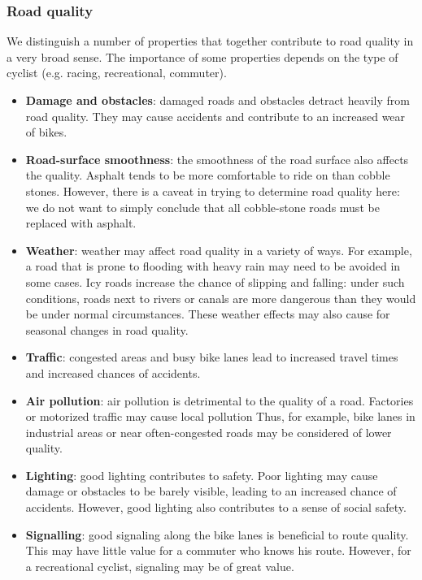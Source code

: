 \documentclass[a4paper,11pt]{article}
\begin{document}
\subsubsection{Road quality}

We distinguish a number of properties that together contribute to road quality in a very broad sense. The importance of some properties depends on the type of cyclist (e.g. racing, recreational, commuter).
\begin{itemize}\setlength{\itemsep}{-3pt}
\item \textbf{Damage and obstacles}: damaged roads and obstacles detract heavily from road quality. They may cause accidents and contribute to an increased wear of bikes.
\item \textbf{Road-surface smoothness}: the smoothness of the road surface also affects the quality. Asphalt tends to be more comfortable to ride on than cobble stones. However, there is a caveat in trying to determine road quality here: we do not want to simply conclude that all cobble-stone roads must be replaced with asphalt.
\item \textbf{Weather}: weather may affect road quality in a variety of ways. For example, a road that is prone to flooding with heavy rain may need to be avoided in some cases. Icy roads increase the chance of slipping and falling: under such conditions, roads next to rivers or canals are more dangerous than they would be under normal circumstances. These weather effects may also cause for seasonal changes in road quality.
\item \textbf{Traffic}: congested areas and busy bike lanes lead to increased travel times and increased chances of accidents.
\item \textbf{Air pollution}: air pollution is detrimental to the quality of a road. Factories or motorized traffic may cause local pollution Thus, for example, bike lanes in industrial areas or near often-congested roads may be considered of lower quality.
\item \textbf{Lighting}: good lighting contributes to safety. Poor lighting may cause damage or obstacles to be barely visible, leading to an increased chance of accidents. However, good lighting also contributes to a sense of social safety.
\item \textbf{Signalling}: good signaling along the bike lanes is beneficial to route quality. This may have little value for a commuter who knows his route. However, for a recreational cyclist, signaling may be of great value.
\end{itemize}
\end{document}
